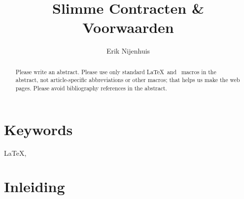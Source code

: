 \documentclass[dutch]{ltugboat}
\title{Slimme Contracten \& Voorwaarden}
\author{Erik Nijenhuis}
\begin{document}
    \maketitle

    \begin{abstract}
        Please write an abstract. Please use only standard \LaTeX\ and \TUB\
        macros in the abstract, not article-specific abbreviations or other
        macros; that helps us make the web pages. Please avoid bibliography
        references in the abstract.
    \end{abstract}

    \section*{Keywords}
    \LaTeX, \BibTeX

    \section{Inleiding}



    
    \nocite{book-minimal}      %

    \makesignature
\end{document}
